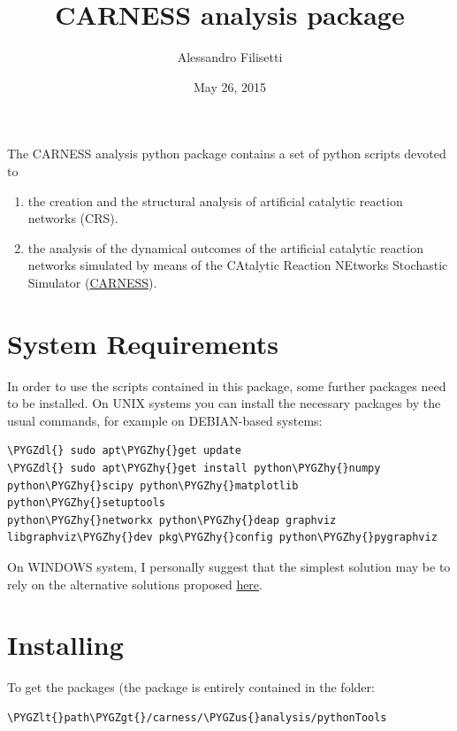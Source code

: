 \documentclass[letterpaper,10pt,english]{sphinxmanual}
\title{CARNESS analysis package}
\date{May 26, 2015}
\author{Alessandro Filisetti}
\def\PYGZus{\char`\_}
\def\PYGZlt{\char`\<}
\def\PYGZgt{\char`\>}
\def\PYGZdl{\char`\$}
\def\PYGZhy{\char`\-}
\begin{document}
\maketitle
\tableofcontents
{}\label{index::doc}


The CARNESS analysis python package contains a set of python scripts devoted to
\begin{enumerate}
\item {} 
the creation and the structural analysis of artificial catalytic reaction networks (CRS).

\item {} 
the analysis of the dynamical outcomes of the artificial catalytic reaction networks simulated by means of the CAtalytic Reaction NEtworks Stochastic Simulator (\href{https://github.com/paxelito/carness}{CARNESS}).

\end{enumerate}


\chapter{System Requirements}
\label{index:carness-analysis-python-package-documentation}\label{index:system-requirements}
In order to use the scripts contained in this package, some further packages need to be installed.
On UNIX systems you can install the necessary packages by the usual commands, for example on DEBIAN-based systems:

\begin{Verbatim}[commandchars=\\\{\}]
\PYGZdl{} sudo apt\PYGZhy{}get update
\PYGZdl{} sudo apt\PYGZhy{}get install python\PYGZhy{}numpy python\PYGZhy{}scipy python\PYGZhy{}matplotlib python\PYGZhy{}setuptools
python\PYGZhy{}networkx python\PYGZhy{}deap graphviz libgraphviz\PYGZhy{}dev pkg\PYGZhy{}config python\PYGZhy{}pygraphviz
\end{Verbatim}

On WINDOWS system, I personally suggest that the simplest solution may be to rely on the alternative solutions proposed \href{https://www.python.org/download/alternatives/}{here}.


\chapter{Installing}
\label{index:installing}
To get the packages (the package is entirely contained in the folder:

\begin{Verbatim}[commandchars=\\\{\}]
\PYGZlt{}path\PYGZgt{}/carness/\PYGZus{}analysis/pythonTools
\end{Verbatim}
\end{document}
